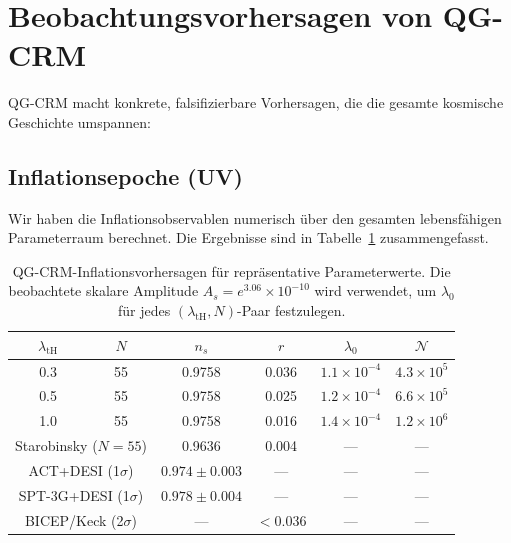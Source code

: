 \documentclass[aps,prd,twocolumn,superscriptaddress,nofootinbib]{revtex4-2}
\begin{document}
\section{Beobachtungsvorhersagen von QG-CRM}
\label{sec:predictions}

QG-CRM macht konkrete, falsifizierbare Vorhersagen, die die gesamte kosmische Geschichte umspannen:

\subsection{Inflationsepoche (UV)}

Wir haben die Inflationsobservablen numerisch über den gesamten lebensfähigen Parameterraum berechnet. Die Ergebnisse sind in Tabelle~\ref{tab:observables} zusammengefasst.

\begin{table}[h]
\caption{QG-CRM-Inflationsvorhersagen für repräsentative Parameterwerte. Die beobachtete skalare Amplitude $A_s = e^{3.06} \times 10^{-10}$ wird verwendet, um $\lambda_0$ für jedes $(\lambda_\mathrm{tH}, N)$-Paar festzulegen.}
\begin{tabular}{cccccc}
\toprule
$\lambda_\mathrm{tH}$ & $N$ & $n_s$ & $r$ & $\lambda_0$ & $\mathcal{N}$ \\
\midrule
0.3 & 55 & 0.9758 & 0.036 & $1.1 \times 10^{-4}$ & $4.3 \times 10^5$ \\
0.5 & 55 & 0.9758 & 0.025 & $1.2 \times 10^{-4}$ & $6.6 \times 10^5$ \\
1.0 & 55 & 0.9758 & 0.016 & $1.4 \times 10^{-4}$ & $1.2 \times 10^6$ \\
\midrule
\multicolumn{2}{c}{Starobinsky ($N=55$)} & 0.9636 & 0.004 & --- & --- \\
\multicolumn{2}{c}{ACT+DESI (1$\sigma$)} & $0.974 \pm 0.003$ & --- & --- & --- \\
\multicolumn{2}{c}{SPT-3G+DESI (1$\sigma$)} & $0.978 \pm 0.004$ & --- & --- & --- \\
\multicolumn{2}{c}{BICEP/Keck (2$\sigma$)} & --- & $<0.036$ & --- & --- \\
\bottomrule
\end{tabular}
\label{tab:observables}
\end{table}
\end{document}
